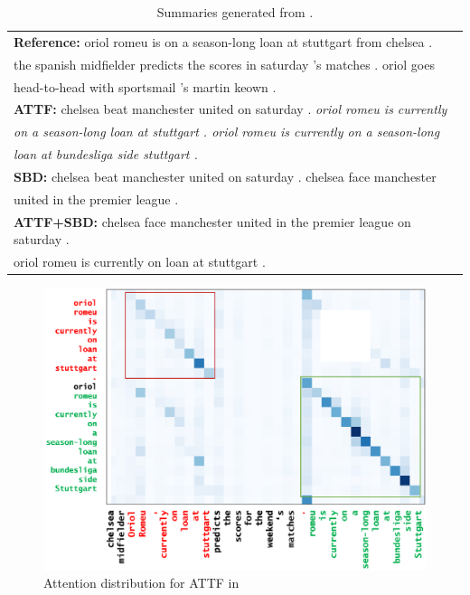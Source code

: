 \begin{table}[th!]
\begin{center}
\scriptsize
\begin{tabular}{|l|}%
\hline \textbf{Reference:} oriol romeu is on a season-long loan at stuttgart from chelsea . \\
       the spanish midfielder predicts the scores in saturday 's matches . oriol goes \\
	   head-to-head with sportsmail 's martin keown .\\
\hline \textbf{ATTF:} chelsea beat manchester united on saturday . \textit{oriol romeu is currently} \\
       \textit{on a season-long loan at stuttgart . oriol romeu is currently on a season-long} \\
	   \textit{loan at bundesliga side stuttgart .}\\
\hline \textbf{SBD:} chelsea beat manchester united on saturday . chelsea face manchester \\
       united in the premier league . \\ 
\hline \textbf{ATTF+SBD:} chelsea face manchester united in the premier league on saturday . \\
       oriol romeu is currently on loan at stuttgart . \\
\hline
\end{tabular}
\end{center}
\caption{Summaries generated from .}
\label{tab:src_rep}
\end{table}

\begin{figure}[th!]
\centering
\includegraphics[width=0.84\columnwidth]{map3}
\caption{Attention distribution for ATTF in }
\label{fig:attn_map3}
\end{figure}

